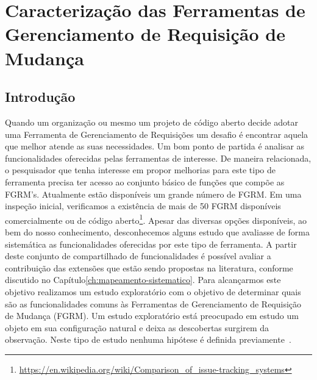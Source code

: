 \chapter{Caracterização das Ferramentas de Gerenciamento de Requisição de
	Mudança}
\label{ch:caracterizacao}


\section{Introdução}
Quando um organização ou mesmo um projeto de código aberto decide adotar uma
Ferramenta de Gerenciamento de Requisições um desafio é encontrar aquela que
melhor atende as suas necessidades. Um bom ponto de partida é analisar as
funcionalidades oferecidas pelas ferramentas de interesse. De maneira
relacionada, o pesquisador que tenha interesse em propor melhorias para este
tipo de ferramenta precisa ter acesso ao conjunto básico de funções que compõe
as FGRM's.
Atualmente estão disponíveis um grande número de FGRM. Em uma inspeção inicial,
verificamos a existência de mais de 50 FGRM disponíveis comercialmente ou de
código
aberto\footnote{\url{https://en.wikipedia.org/wiki/Comparison_of_issue-tracking_systems}}.
Apesar das diversas opções disponíveis, ao bem do nosso conhecimento,
desconhecemos alguns estudo que avaliasse de forma sistemática as
funcionalidades oferecidas por este tipo de ferramenta. A partir deste conjunto
de compartilhado de funcionalidades é possível avaliar a contribuição das
extensões que estão sendo propostas na literatura, conforme discutido no
Capítulo\ref{ch:mapeamento-sistematico}.
Para alcançarmos este objetivo realizamos um estudo exploratório com o objetivo
de determinar quais são as funcionalidades comuns às Ferramentas de
Gerenciamento de Requisição de Mudança (FGRM). Um estudo exploratório está
preocupado em estudo um objeto em sua configuração natural e deixa as
descobertas surgirem da observação. Neste tipo de estudo nenhuma hipótese é
definida previamente~\cite{wohlin2012experimentation}.

